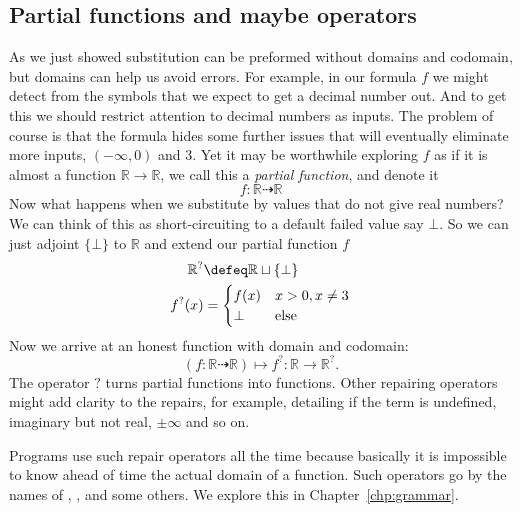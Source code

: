 \subsection{Partial functions and maybe operators}
As we just showed substitution can be preformed without domains and codomain, but 
domains can help us avoid errors.  For example, in our formula $f$ we might detect 
from the symbols that we expect to get a decimal number out.  And to get this 
we should restrict attention to decimal numbers as inputs. 
The problem of course is that the formula hides some further issues that will 
eventually eliminate more inputs, $(-\infty,0)$ and $3$.  Yet it may be 
worthwhile exploring $f$ as if it is almost a function $\mathbb{R}\to \mathbb{R}$,
we call this a \emph{partial function}, and denote it 
\[ 
    f:\mathbb{R}\dashrightarrow \mathbb{R}
\] 
Now what happens when we substitute by values that do not give real numbers?  We 
can think of this as short-circuiting to a default failed value say $\bot$.  So 
we can just adjoint $\{\bot\}$ to $\mathbb{R}$ and extend our partial function $f$
\begin{align*}
    \mathbb{R}^? & \defeq \mathbb{R}\sqcup \{\bot \}\\
    f^?(x) & = \begin{cases}
                f(x)  & x>0, x\neq 3\\
                \bot & \text{else}
    \end{cases}             
\end{align*}
Now we arrive at an honest function with domain and codomain:
\[
    (f:\mathbb{R}\dashrightarrow \mathbb{R})\mapsto f^?:\mathbb{R}\to \mathbb{R}^?.
\]
The operator $?$ turns partial functions into functions.
Other repairing operators might add clarity to the repairs, for example, 
detailing if the term is undefined, imaginary but not real, $\pm\infty$ and so on.

Programs use such repair operators all the time because basically it is impossible to 
know ahead of time the actual domain of a function.  Such operators go by the 
names of , ,  and some others.
We explore this in  Chapter~\ref{chp:grammar}.
